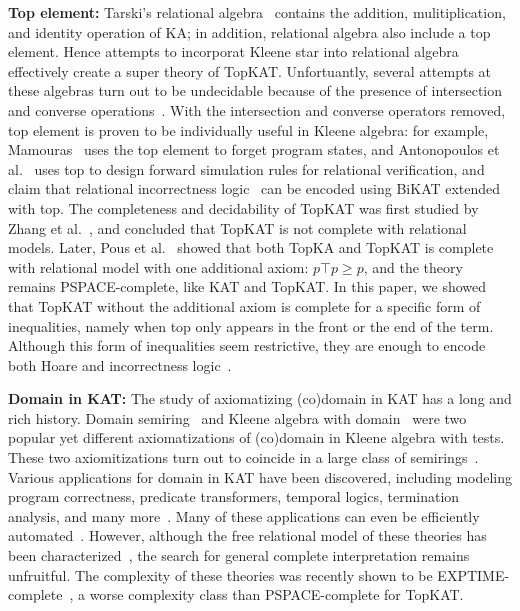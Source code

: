 \textbf{Top element:}
Tarski's relational algebra~\cite{tarski_CalculusRelations_1941} contains the addition, 
mulitiplication, and identity operation of KA;  
in addition, relational algebra also include a top element. 
Hence attempts to incorporat Kleene star into relational algebra 
effectively create a super theory of TopKAT.
Unfortuantly, several attempts at these algebras turn out to be undecidable
because of the presence of intersection and 
converse operations~\cite{andrekaAxiomatizabilityPositiveAlgebras2011, pous_PositiveCalculusRelations_2018}.
With the intersection and converse operators removed, 
top element is proven to be individually useful in Kleene algebra:
for example, Mamouras~\cite{Mamouras_2017} uses the top element to forget program states,
and Antonopoulos et al.~\cite{Antonopoulos_Koskinen_Le_Nagasamudram_Naumann_Ngo_2022} 
uses top to design forward simulation rules for relational verification, 
and claim that relational incorrectness logic~\cite{murray_UnderApproximateRelationalLogic_2020a} 
can be encoded using BiKAT extended with top.
The completeness and decidability of TopKAT was first studied by Zhang et al.~\cite{Zhang_de_Amorim_Gaboardi_2022},
and concluded that TopKAT is not complete with relational models.
Later, Pous et al.~\cite{Pous_Wagemaker_2022,Pous_Wagemaker_2023} showed that 
both TopKA and TopKAT is complete with relational model with one additional axiom: \(p ⊤ p ≥ p\),
and the theory remains PSPACE-complete, like KAT and TopKAT.
In this paper, we showed that TopKAT without the additional axiom is complete 
for a specific form of inequalities, namely when top only appears in the front or the end of the term.
Although this form of inequalities seem restrictive, 
they are enough to encode both Hoare and incorrectness logic~\cite{Zhang_de_Amorim_Gaboardi_2022}.

\textbf{Domain in KAT:}
The study of axiomatizing (co)domain in KAT has a long and rich history. 
Domain semiring~\cite{Desharnais_Struth_2011} 
and Kleene algebra with domain~\cite{Desharnais_Möller_Struth_2006}
were two popular yet different axiomatizations of (co)domain in Kleene algebra with tests.
These two axiomitizations turn out to coincide in a large class of semirings~\cite{Fahrenberg_Johansen_Struth_Ziemiánski_2021}.
Various applications for domain in KAT have been discovered, including modeling
program correctness, predicate transformers, temporal logics, 
termination analysis, and many more~\cite{Desharnais_Möller_Struth_2004}.
Many of these applications can even be efficiently automated~\cite{hofner_AutomatedReasoningKleene_2007}.
However, although the free relational model of these theories has been characterized~\cite{mclean_FreeKleeneAlgebras_2020},
the search for general complete interpretation remains unfruitful.
The complexity of these theories was recently shown to be EXPTIME-complete~\cite{Sedlár_2023},
a worse complexity class than PSPACE-complete for TopKAT.
